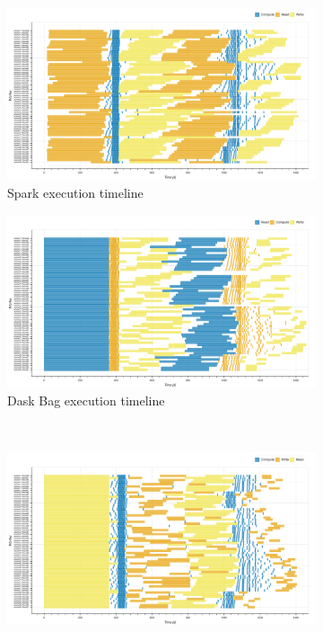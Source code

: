 \documentclass[conference]{IEEEtran}
\begin{document}
\begin{figure}[!htb]
    \centering
    \begin{subfigure}[b]{\columnwidth}
        \includegraphics[clip,width=\columnwidth]{images/spark_inc_baseline_gantt.png}
        \caption{Spark execution timeline}\label{fig:inc_spark_gantt}
    \end{subfigure}
    \hfill
    \begin{subfigure}[b]{\columnwidth}
        \includegraphics[clip,width=\columnwidth]{images/Dask_bag_inc_baseline_gantt.png}%
        \caption{Dask Bag execution timeline}\label{fig:inc_dask_bag_gantt}
    \end{subfigure}
    \\
    \begin{subfigure}[b]{\columnwidth}
        \includegraphics[clip,width=\columnwidth]{images/Dask_delayed_inc_baseline_gantt.png}%

\end{subfigure}
\end{figure}
\end{document}
